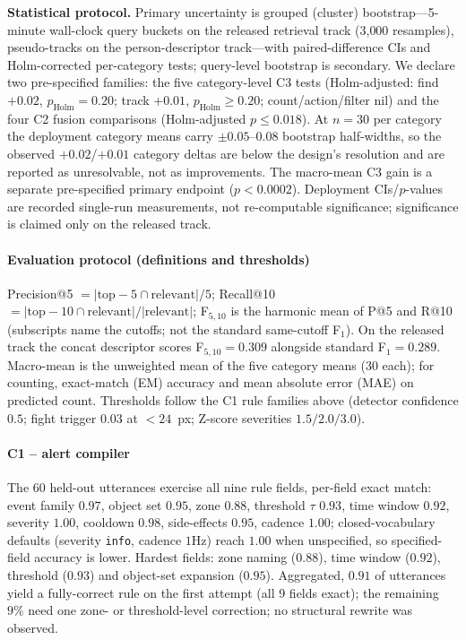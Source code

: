 ﻿\documentclass[conference]{IEEEtran}
\theoremstyle{plain}
\begin{document}
\textbf{Statistical protocol.} Primary uncertainty is grouped (cluster) bootstrap---5-minute wall-clock query buckets on the released retrieval track (3{,}000 resamples), pseudo-tracks on the person-descriptor track---with paired-difference CIs and Holm-corrected per-category tests; query-level bootstrap is secondary. We declare two pre-specified families: the five category-level C3 tests (Holm-adjusted: find $+0.02$, $p_{\mathrm{Holm}}{=}0.20$; track $+0.01$, $p_{\mathrm{Holm}}{\ge}0.20$; count/action/filter nil) and the four C2 fusion comparisons (Holm-adjusted $p\le0.018$). At $n{=}30$ per category the deployment category means carry $\pm0.05$--$0.08$ bootstrap half-widths, so the observed $+0.02$/$+0.01$ category deltas are below the design's resolution and are reported as unresolvable, not as improvements. The macro-mean C3 gain is a separate pre-specified primary endpoint ($p<0.0002$). Deployment CIs/$p$-values are recorded single-run measurements, not re-computable significance; significance is claimed only on the released track.

\paragraph*{Evaluation protocol (definitions and thresholds)}
Precision@5 $=|\mathrm{top\!-\!5}\cap\mathrm{relevant}|/5$; Recall@10 $=|\mathrm{top\!-\!10}\cap\mathrm{relevant}|/|\mathrm{relevant}|$; F$_{5,10}$ is the harmonic mean of P@5 and R@10 (subscripts name the cutoffs; not the standard same-cutoff F$_1$). On the released track the concat descriptor scores F$_{5,10}{=}0.309$ alongside standard F$_1{=}0.289$. Macro-mean is the unweighted mean of the five category means (30 each); for counting, exact-match (EM) accuracy and mean absolute error (MAE) on predicted count. Thresholds follow the C1 rule families above (detector confidence $0.5$; fight trigger $0.03$ at $<24$~px; Z-score severities $1.5/\allowbreak 2.0/\allowbreak 3.0$).

\paragraph*{C1 -- alert compiler}
The 60 held-out utterances exercise all nine rule fields, per-field exact match: event family $0.97$, object set $0.95$, zone $0.88$, threshold $\tau$ $0.93$, time window $0.92$, severity $1.00$, cooldown $0.98$, side-effects $0.95$, cadence $1.00$; closed-vocabulary defaults (severity \texttt{info}, cadence $1$Hz) reach $1.00$ when unspecified, so specified-field accuracy is lower. Hardest fields: zone naming ($0.88$), time window ($0.92$), threshold ($0.93$) and object-set expansion ($0.95$). Aggregated, $0.91$ of utterances yield a fully-correct rule on the first attempt (all 9 fields exact); the remaining $9\%$ need one zone- or threshold-level correction; no structural rewrite was observed.
\end{document}
